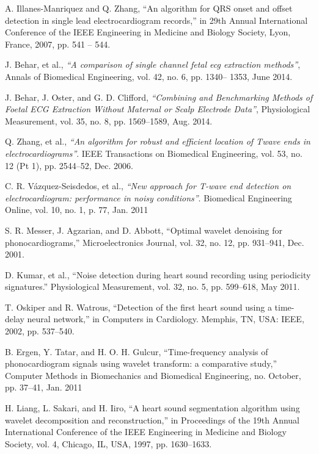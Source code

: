 \begin{thebibliography}{9}
A. Illanes-Manriquez and Q. Zhang, “An algorithm for QRS onset and
offset detection in single lead electrocardiogram records,” in 29th Annual International Conference of the IEEE Engineering in Medicine and Biology Society, Lyon, France, 2007, pp. 541 – 544.

J. Behar, et al., \textit{“A comparison of single channel fetal ecg extraction methods”}, Annals of Biomedical Engineering, vol. 42, no. 6, pp. 1340–
1353, June 2014.

J. Behar, J. Oster, and G. D. Clifford, \textit{“Combining and Benchmarking
Methods of Foetal ECG Extraction Without Maternal or Scalp Electrode Data”}, Physiological Measurement, vol. 35, no. 8, pp. 1569–1589, Aug.
2014.

Q. Zhang, et al., \textit{“An algorithm for robust and efficient location of Twave ends in electrocardiograms”}. IEEE Transactions on Biomedical Engineering, vol. 53, no. 12 (Pt 1), pp. 2544–52, Dec. 2006.

C. R. Vázquez-Seisdedos, et al., \textit{“New approach for T-wave end
detection on electrocardiogram: performance in noisy conditions”}.
Biomedical Engineering Online, vol. 10, no. 1, p. 77, Jan. 2011

S. R. Messer, J. Agzarian, and D. Abbott, “Optimal wavelet denoising
for phonocardiograms,” Microelectronics Journal, vol. 32, no. 12, pp.
931–941, Dec. 2001.

D. Kumar, et al., “Noise detection during heart sound recording using
periodicity signatures.” Physiological Measurement, vol. 32, no. 5, pp. 599–618, May 2011.

T. Oskiper and R. Watrous, “Detection of the first heart sound using a time-delay neural network,” in Computers in Cardiology. Memphis,
TN, USA: IEEE, 2002, pp. 537–540.

B. Ergen, Y. Tatar, and H. O. H. Gulcur, “Time-frequency analysis of
phonocardiogram signals using wavelet transform: a comparative study,” Computer Methods in Biomechanics and Biomedical Engineering, no. October, pp. 37–41, Jan. 2011

H. Liang, L. Sakari, and H. Iiro, “A heart sound segmentation algorithm using wavelet decomposition and reconstruction,” in Proceedings of the 19th Annual International Conference of the IEEE Engineering in Medicine and Biology Society, vol. 4, Chicago, IL, USA, 1997, pp. 1630–1633.


\end{thebibliography}
